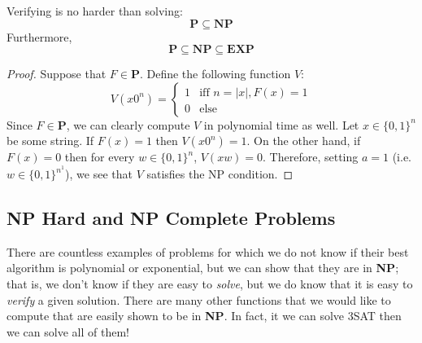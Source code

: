   \begin{theorem}
    \label{thm:psubseteqnp}
  Verifying is no harder than solving: 
  \begin{equation}
    \mathbf{P} \subseteq \mathbf{NP}
  \end{equation}
  Furthermore, 
  \begin{equation}
    \mathbf{P} \subseteq \mathbf{NP} \subseteq \mathbf{EXP}
  \end{equation}
  \begin{center}
  \end{center}
  \end{theorem}
  \begin{proof}
  Suppose that $F \in \mathbf{P}$. Define the following function $V$:
  \begin{equation}
    V (x 0^n) = \begin{cases}
      1 & \text{iff } n = |x|, F(x) = 1 \\
      0 & \text{else}
      \end{cases}
  \end{equation}
  Since $F \in \mathbf{P}$, we can clearly compute $V$ in polynomial time as well. Let $x \in \{0,1\}^n$ be some string. If $F(x) = 1$ then $V(x 0^n) = 1$. On the other hand, if $F(x) = 0$ then for every $w \in \{0,1\}^n$, $V(xw) = 0$. Therefore, setting $a = 1$ (i.e. $w \in \{0,1\}^{n^1}$), we see that $V$ satisfies the NP condition. 
  \end{proof}

\subsection{NP Hard and NP Complete Problems}

  There are countless examples of problems for which we do not know if their best algorithm is polynomial or exponential, but we can show that they are in \textbf{NP}; that is, we don't know if they are easy to \textit{solve}, but we do know that it is easy to \textit{verify} a given solution. There are many other functions that we would like to compute that are easily shown to be in \textbf{NP}. In fact, it we can solve 3SAT then we can solve all of them! 

